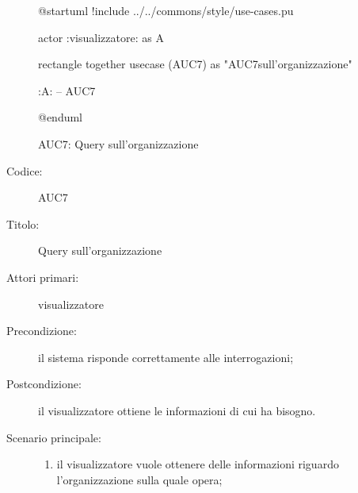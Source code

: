 \documentclass[../../../analisi-dei-requisiti.tex]{subfiles}
\begin{document}
\begin{figure}[H]
  \centering
  \begin{plantuml}
  @startuml
  !include ../../commons/style/use-cases.pu

  actor :visualizzatore: as A

  rectangle {
    together {
      usecase (AUC7) as "AUC7\nQuery sull'organizzazione"
    }
  }

  :A: -- AUC7

  @enduml
  \end{plantuml}
  \caption{AUC7: Query sull'organizzazione}%
  \label{fig:AUC7}
\end{figure}

\begin{description}
  \item[Codice:] AUC7
  \item[Titolo:] Query sull'organizzazione
  \item[Attori primari:] visualizzatore
  \item[Precondizione:] il sistema risponde correttamente alle interrogazioni;
  \item[Postcondizione:] il visualizzatore ottiene le informazioni di cui ha bisogno.
  \item[Scenario principale:]
  \begin{enumerate}
    \item il visualizzatore vuole ottenere delle informazioni riguardo l'organizzazione sulla quale opera;
  \end{enumerate}
\end{description}
\end{document}
